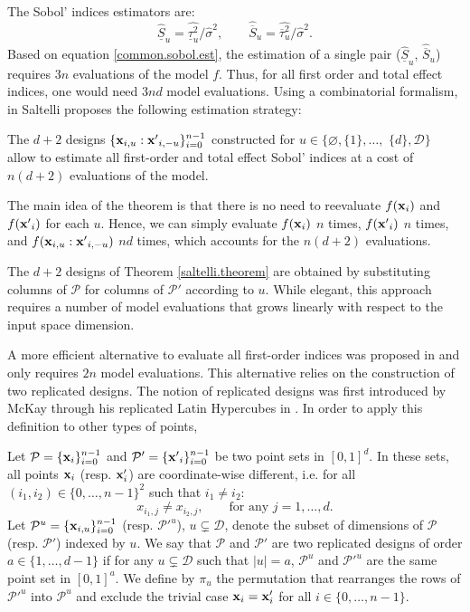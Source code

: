 The Sobol' indices estimators are:
\begin{equation}
\widehat{\underline{S}}_u = \widehat{\underline{\tau}_u^2} / \widehat{\sigma}^2, \qquad
\widehat{\overline{S}}_u = \widehat{\overline{\tau}_u^2} / \widehat{\sigma}^2.
\label{common.sobol.est}
\end{equation}
Based on equation \eqref{common.sobol.est}, the estimation of a single pair ($\widehat{\underline{S}}_u$, $\widehat{\overline{S}}_u$) requires $3n$ evaluations of the model $f$. Thus, for all first order and total effect indices, one would need $3nd$ model evaluations. Using a combinatorial formalism, in \cite{Saltelli} Saltelli proposes the following estimation strategy:
\begin{theorem}
\label{saltelli.theorem}
The $d+2$ designs $\{\boldsymbol{\mathbf{x}}_{i,u}:{\boldsymbol{\mathbf{x}}'}_{i,-u}\}_{i=0}^{n-1}$ constructed for $u \in \{\varnothing,\{1\},\dots,$ $\{d\},\mathcal{D}\}$ allow to estimate all first-order and total effect Sobol' indices at a cost of $n(d+2)$ evaluations of the model.
\end{theorem}
The main idea of the theorem is that there is no need to reevaluate $f({\boldsymbol{\mathbf{x}}}_i)$ and $f({\boldsymbol{\mathbf{x}}'}_i)$ for each $u$. Hence, we can simply evaluate $f({\boldsymbol{\mathbf{x}}}_i)$ $n$ times, $f({\boldsymbol{\mathbf{x}}'}_i)$ $n$ times, and $f(\boldsymbol{\mathbf{x}}_{i,u}:{\boldsymbol{\mathbf{x}}'}_{i,-u})$ $nd$ times, which accounts for the $n(d+2)$ evaluations.

The $d+2$ designs of Theorem \ref{saltelli.theorem} are obtained by substituting columns of $\mathcal{P}$ for columns of $\mathcal{P}'$ according to $u$. While elegant, this approach requires a number of model evaluations that grows linearly with respect to the input \break space dimension.

A more efficient alternative to evaluate all first-order indices was proposed in \cite{Mara} and only requires $2n$ model evaluations. This alternative relies on the construction of two replicated designs. The notion of replicated designs was first introduced by McKay through his replicated Latin Hypercubes in \cite{McKay}. In order to apply this definition to other types of points, 

\begin{definition}
\label{rep.designs}
Let $\mathcal{P}=\{\boldsymbol{\mathbf{x}}_i\}_{i=0}^{n-1}$ and $\mathcal{P}'=\{{\boldsymbol{\mathbf{x}}'}_i\}_{i=0}^{n-1}$ be two point sets in $[0,1]^{d}$. In these sets, all points $\boldsymbol{\mathbf{x}}_i$ (resp. $\boldsymbol{\mathbf{x}}'_i$) are coordinate-wise different, i.e. for all $(i_1,i_2) \in \{0,\dots,n-1\}^2$ such that $i_1 \neq i_2$: $$x_{i_1,j} \neq x_{i_2,j}, \qquad \text{for any  } j=1,\dots,d .$$
Let $\mathcal{P}^u=\{\boldsymbol{\mathbf{x}}_{i,u}\}_{i=0}^{n-1}$ (resp. ${\mathcal{P}'}^u$), $u \subsetneq \mathcal{D}$, denote the subset of dimensions of $\mathcal{P}$ (resp. $\mathcal{P}'$) indexed by $u$. We say that $\mathcal{P}$ and $\mathcal{P}'$ are two replicated designs of order $a \in \{1,\dots,d-1\}$ if for any $u \subsetneq \mathcal{D}$ such that $|u|=a$, $\mathcal{P}^u$ and ${\mathcal{P}'}^u$ are the same point set in $[0,1]^a$. We define by $\pi_u$ the permutation that rearranges the rows of ${\mathcal{P}'}^u$ into $\mathcal{P}^u$ and exclude the trivial case $\boldsymbol{\mathbf{x}}_i = \boldsymbol{\mathbf{x}}'_i$ for all $i\in\{0,\dots,n-1\}$.
\end{definition}

